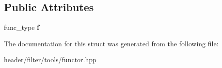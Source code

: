 \subsection*{Public Attributes}
\begin{DoxyCompactItemize}
\item 
\mbox{\label{structdt_functor_1_1wrapped_a328e30f3387142abb5b8c9b3fd220d15}} 
func\+\_\+type {\bfseries f}
\end{DoxyCompactItemize}


The documentation for this struct was generated from the following file\+:\begin{DoxyCompactItemize}
\item 
header/filter/tools/functor.\+hpp\end{DoxyCompactItemize}
